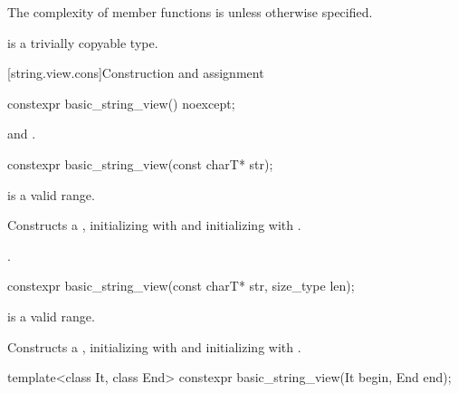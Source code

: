 \pnum
The complexity of  member functions is 
unless otherwise specified.

\pnum
{} is
a trivially copyable type.

[string.view.cons]{Construction and assignment}

%
\begin{itemdecl}
constexpr basic_string_view() noexcept;
\end{itemdecl}

\begin{itemdescr}
\pnum
\ensures
{} and .
\end{itemdescr}

%
\begin{itemdecl}
constexpr basic_string_view(const charT* str);
\end{itemdecl}

\begin{itemdescr}
\pnum
\expects
{} is a valid range.

\pnum
\effects
Constructs a , initializing  with 
and initializing  with .

\pnum
\complexity
{}.
\end{itemdescr}

%
\begin{itemdecl}
constexpr basic_string_view(const charT* str, size_type len);
\end{itemdecl}

\begin{itemdescr}
\pnum
\expects
{} is a valid range.

\pnum
\effects
Constructs a , initializing  with 
and initializing  with .
\end{itemdescr}

%
\begin{itemdecl}
template<class It, class End>
  constexpr basic_string_view(It begin, End end);
\end{itemdecl}

